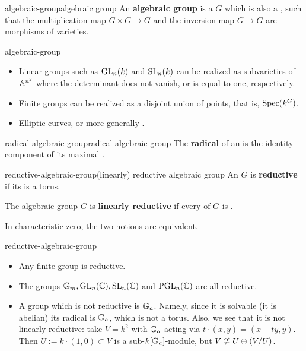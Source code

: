 \begin{topic}{algebraic-group}{algebraic group}
    An \textbf{algebraic group} is a  $G$ which is also a , such that the multiplication map $G \times G \to G$ and the inversion map $G \to G$ are morphisms of varieties.
\end{topic}

\begin{example}{algebraic-group}
    \begin{itemize}
        \item Linear groups such as $\textup{GL}_n(k)$ and $\textup{SL}_n(k)$ can be realized as subvarieties of $\AA^{n^2}$ where the determinant does not vanish, or is equal to one, respectively.
        \item Finite groups can be realized as a disjoint union of points, that is, $\Spec (k^G)$.
        \item Elliptic curves, or more generally .
    \end{itemize}
\end{example}

\begin{topic}{radical-algebraic-group}{radical algebraic group}
    The \textbf{radical} of an  is the identity component of its maximal   .
\end{topic}

\begin{topic}{reductive-algebraic-group}{(linearly) reductive algebraic group}
    An  $G$ is \textbf{reductive} if its  is a torus.
    
    The algebraic group $G$ is \textbf{linearly reductive} if every  of $G$ is .
    
    In characteristic zero, the two notions are equivalent.
\end{topic}

\begin{example}{reductive-algebraic-group}
    \begin{itemize}
        \item Any finite group is reductive.
        \item The groups $\GG_m, \textup{GL}_n(\CC), \textup{SL}_n(\CC)$ and $\textup{PGL}_n(\CC)$ are all reductive. 
        \item A group which is not reductive is $\GG_a$. Namely, since it is solvable (it is abelian) its radical is $\GG_a$, which is not a torus. Also, we see that it is not linearly reductive: take $V = k^2$ with $\GG_a$ acting via $t \cdot (x, y) = (x + ty, y)$. Then $U := k \cdot (1, 0) \subset V$ is a sub-$k[\GG_a]$-module, but $V \not\isom U \oplus (V / U)$.
    \end{itemize}
\end{example}

